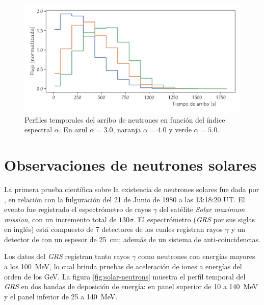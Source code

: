 \begin{figure}
        \centering
        \includegraphics[width=\textwidth]{neutron-time.pdf}
        \caption{Perfiles temporales del arribo de neutrones en función del índice espectral $\alpha$. En azul $\alpha=3.0$, naranja $\alpha=4.0$ y verde $\alpha=5.0$.}
        \label{fig:neutron-time}
\end{figure}

\section{Observaciones de neutrones solares}

La primera prueba científica sobre la existencia de neutrones solares fue dada por \cite{chupp82}, en relación con la fulguración del \num{21} de Junio de \num{1980} a las 13:18:20 UT. El evento fue registrado el espectrómetro de rayos $\gamma$ del satélite \emph{Solar maximum mission}, con un incremento total de $130\sigma$. El espectrómetro (\emph{GRS} por sus siglas en inglés) está compuesto de \num{7} detectores de  los cuales registran rayos $\gamma$ y un detector de  con un espesor de \SI{25}{\centi\metre}; además de un sistema de anti-coincidencias.

Los datos del \emph{GRS} registran tanto rayos $\gamma$ como neutrones con energías mayores a los \SI{100}{\mega\electronvolt}, lo cual brinda pruebas de aceleración de iones a energías del orden de los \si{\giga\electronvolt}. La figura \ref{fig:solar-neutrons} muestra el perfil temporal del \emph{GRS} en dos bandas de deposición de energía: en panel superior de \num{10} a \SI{140}{\mega\electronvolt} y el panel inferior de \num{25} a \SI{140}{\mega\electronvolt}.

